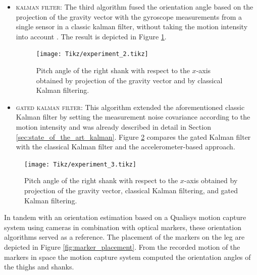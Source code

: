 \begin{itemize}
  \item \textsc{kalman filter:} The third algorithm fused the orientation angle based on the projection of the gravity vector with the gyroscope measurements from a single sensor in a classic kalman filter, without taking the motion intensity into account \cite{olivares_vicente_gaitwatch_2013}. The result is depicted in Figure \ref{fig:experiment_2}.

  \begin{figure}
	\centering
	\setlength\figureheight{7cm} 
	\setlength\figurewidth{\textwidth}
	\texttt{[image: Tikz/experiment\_2.tikz]}
	\caption{Pitch angle of the right shank with respect to the $x$-axis obtained by projection of the gravity vector and by classical Kalman filtering.}
	\label{fig:experiment_2}
\end{figure}
  
  \item \textsc{gated kalman filter:} This algorithm extended the aforementioned classic Kalman filter by setting the measurement noise covariance according to the motion intensity \cite{olivares_vicente_gaitwatch_2013} and was already described in detail in Section \ref{sec:state_of_the_art_kalman}. Figure \ref{fig:experiment_3} compares the gated Kalman filter with the classical Kalman filter and the accelerometer-based approach.
  \end{itemize}
  
\begin{figure}
	\centering
	\setlength\figureheight{7cm} 
	\setlength\figurewidth{\textwidth}
	\texttt{[image: Tikz/experiment\_3.tikz]}
	\caption{Pitch angle of the right shank with respect to the $x$-axis obtained by projection of the gravity vector, classical Kalman filtering, and gated Kalman filtering.}
	\label{fig:experiment_3}
\end{figure}

In tandem with an orientation estimation based on a Qualisys motion capture system using cameras in combination with optical markers, these orientation algorithms served as a reference. The placement of the markers on the leg are depicted in Figure \ref{fig:marker_placement}. From the recorded motion of the markers in space the motion capture system computed the orientation angles of the thighs and shanks.

